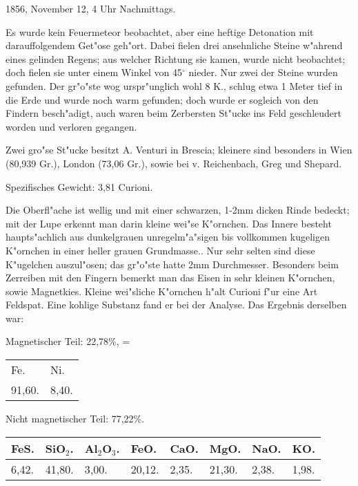 \documentclass[a4paper, 11pt, oneside]{article}
\begin{document}
1856, November 12, 4 Uhr Nachmittags.

Es wurde kein Feuermeteor beobachtet, aber eine heftige Detonation mit darauffolgendem Get"ose geh"ort. Dabei fielen drei ansehnliche Steine w"ahrend eines gelinden Regens; aus welcher Richtung sie kamen, wurde nicht beobachtet; doch fielen sie unter einem Winkel von 45$^\circ$ nieder. Nur zwei der Steine wurden gefunden. Der gr"o"ste wog urspr"unglich wohl 8 K., schlug etwa 1 Meter tief in die Erde und wurde noch warm gefunden; doch wurde er sogleich von den Findern besch"adigt, auch waren beim Zerbersten St"ucke ins Feld geschleudert worden und verloren gegangen.

Zwei gro"se St"ucke besitzt A. Venturi in Brescia; kleinere sind besonders in Wien (80,939 Gr.), London (73,06 Gr.), sowie bei v. Reichenbach, Greg und Shepard.

Spezifisches Gewicht: 3,81 Curioni.

Die Oberfl"ache ist wellig und mit einer schwarzen, 1-2mm dicken Rinde bedeckt; mit der Lupe erkennt man darin kleine wei"se K"ornchen. Das Innere besteht haupts"achlich aus dunkelgrauen unregelm"a"sigen bis vollkommen kugeligen K"ornchen in einer heller grauen Grundmasse.. Nur sehr selten sind diese K"ugelchen auszul"osen; das gr"o"ste hatte 2mm Durchmesser. Besonders beim Zerreiben mit den Fingern bemerkt man das Eisen in sehr kleinen K"ornchen, sowie Magnetkies. Kleine wei"sliche K"ornchen h"alt Curioni f"ur eine Art Feldspat. Eine kohlige Substanz fand er bei der Analyse. Das Ergebnis derselben war:

\begin{center}
Magnetischer Teil: 22,78\%, =
\end{center}

\begin{table}[H]
    \centering\swabfamily\Large
    \begin{tabular}{l l}
        Fe. & Ni. \\
        91,60. & 8,40. \\
    \end{tabular}
\end{table}

\begin{center}
Nicht magnetischer Teil: 77,22\%.
\end{center}

\begin{table}[H]
    \centering\swabfamily\Large
    \begin{tabular}{l l l l l l l l}
        FeS. & SiO$_{2}$. & Al$_{2}$O$_{3}$. & FeO. & CaO. & MgO. & NaO. & KO. \\ \hline
        6,42. & 41,80. & 3,00. & 20,12. & 2,35. & 21,30. & 2,38. & 1,98. \\
    \end{tabular}
\end{table}
\end{document}
